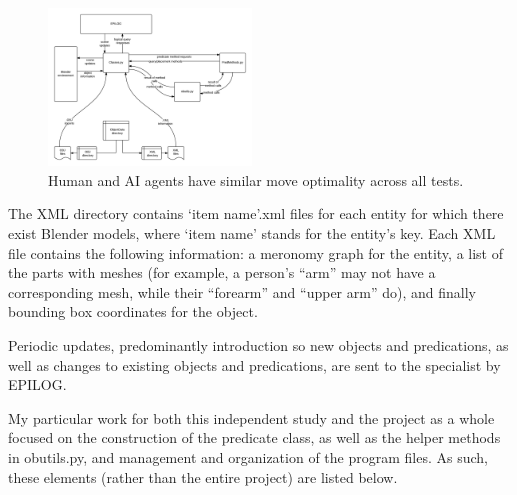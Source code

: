 \begin{figure}
	\begin{center}
		\includegraphics[width=0.48\textwidth]{figures/mirs_flow.png}
	\end{center}
	\caption{Human and AI agents have similar move optimality across all tests.}
\end{figure}

The XML directory contains ‘item name’.xml files for each entity for which there exist Blender models, where ‘item name’ stands for the entity's key. Each XML file contains the following information: a meronomy graph for the entity, a list of the parts with meshes (for example, a person’s “arm” may not have a corresponding mesh, while their “forearm” and “upper arm” do), and finally bounding box coordinates for the object. 

Periodic updates, predominantly introduction so new objects and predications, as well as changes to existing objects and predications, are sent to the specialist by EPILOG.

My particular work for both this independent study and the project as a whole focused on the construction of the predicate class, as well as the helper methods in obutils.py, and management and organization of the program files. As such, these elements (rather than the entire project) are listed below.

